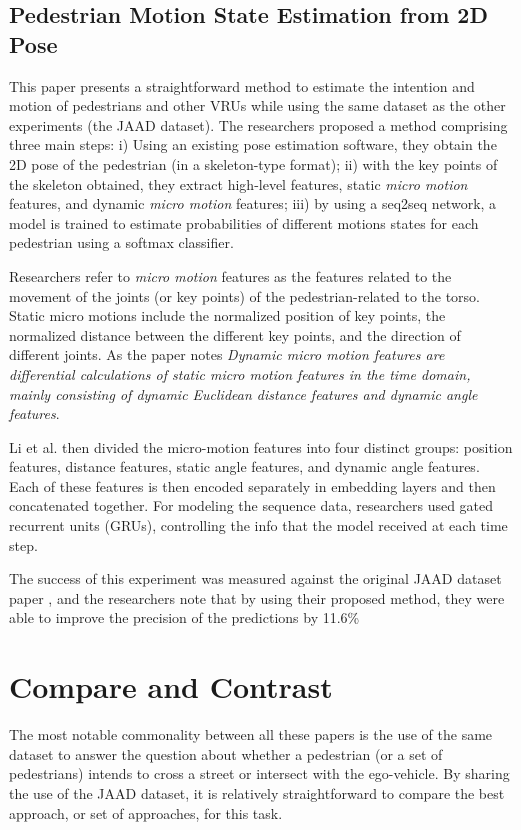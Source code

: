 \documentclass[journal,letterpaper]{IEEEtran}
\begin{document}
\subsection{Pedestrian Motion State Estimation from 2D Pose}

This paper presents a straightforward method to estimate the intention and motion of pedestrians and other VRUs while using the same dataset as the other experiments (the JAAD dataset). The researchers proposed a method comprising three main steps: i) Using an existing pose estimation software, they obtain the 2D pose of the pedestrian (in a skeleton-type format); ii) with the key points of the skeleton obtained, they extract high-level features, static \emph{micro motion} features, and dynamic \emph{micro motion} features; iii) by using a seq2seq network, a model is trained to estimate probabilities of different motions states for each pedestrian using a softmax classifier.

Researchers refer to \emph{micro motion} features as the features related to the movement of the joints (or key points) of the pedestrian-related to the torso. Static micro motions include the normalized position of key points, the normalized distance between the different key points, and the direction of different joints. As the paper notes \emph{Dynamic micro motion features are differential calculations of static micro motion features in the time domain, mainly consisting of dynamic Euclidean distance features and dynamic angle features}.

Li et al. then divided the micro-motion features into four distinct groups: position features, distance features, static angle features, and dynamic angle features. Each of these features is then encoded separately in embedding layers and then concatenated together. For modeling the sequence data, researchers used gated recurrent units (GRUs), controlling the info that the model received at each time step.

The success of this experiment was measured against the original JAAD dataset paper \cite{rasouli2017ICCVW}, and the researchers note that by using their proposed method, they were able to improve the precision of the predictions by 11.6\%

%
\section{Compare and Contrast}\label{sec:compare-and-contrast}
The most notable commonality between all these papers is the use of the same dataset to answer the question about whether a pedestrian (or a set of pedestrians) intends to cross a street or intersect with the ego-vehicle. By sharing the use of the JAAD dataset, it is relatively straightforward to compare the best approach, or set of approaches, for this task.
\end{document}
